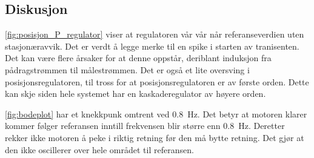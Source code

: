 \subsection{Diskusjon}

\autoref{fig:posisjon_P_regulator} viser at regulatoren vår vår når referanseverdien uten stasjonæravvik. Det er verdt å legge merke til en spike i starten av tranisenten. Det kan være flere årsaker for at denne oppstår, deriblant induksjon fra pådragstrømmen til målestrømmen. Det er også et lite oversving i posisjonsregulatoren, til tross for at posisjonsregulatoren er av første orden. Dette kan skje siden hele systemet har en kaskaderegulator av høyere orden.

\autoref{fig:bodeplot} har et knekkpunk omtrent ved \SI{0.8}{\Hz}. Det betyr at motoren klarer kommer følger referansen inntill frekvensen blir større enn \SI{0.8}{\Hz}. Deretter rekker ikke motoren å peke i riktig retning før den må bytte retning. Det gjør at den ikke oscillerer over hele området til referansen.






































%     


